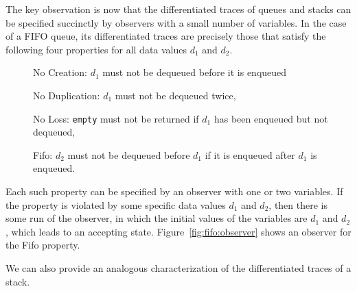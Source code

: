 The key observation is now that the differentiated traces of queues and
stacks can be specified succinctly by observers with a small
number of variables.
%
In the case of a FIFO queue, its differentiated traces are precisely those
that satisfy the following four properties
for all data values $d_1$ and $d_2$.
\begin{description}
\item[] {\sc No Creation:} $d_1$ must not be dequeued before it is enqueued %
\item[] {\sc No Duplication:} $d_1$ must not be dequeued twice, %
\item[] {\sc No Loss:} {\tt empty} must not be returned if $d_1$ has been
enqueued but not dequeued, %
\item[] {\sc Fifo:}   $d_2$ must not be dequeued before $d_1$
  if it is enqueued after $d_1$ is enqueued.
\end{description}
%
Each such property can be specified by an observer with 
one or two variables.
If the property is violated by some
specific data values $d_1$ and $d_2$, then there
is some run of the observer,
in which the initial values of the variables are $d_1$ and $d_2$,
which leads to an accepting state.
Figure~\ref{fig:fifo:observer} shows an observer for the {\sc Fifo} property.

We can also
provide an analogous characterization of the
differentiated traces of a stack.




